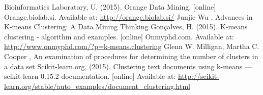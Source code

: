 \documentclass[12pt]{article}
\begin{document}
\begin{thebibliography}{99}
Bioinformatics Laboratory, U. (2015). Orange Data Mining. [online] Orange.biolab.si. Available at: \url{http://orange.biolab.si/} 
 Junjie Wu , Advances in K-means Clustering: A Data Mining Thinking
Gonçalves, H. (2015). K-means clustering - algorithm and examples. [online] Onmyphd.com. Available at: \url{http://www.onmyphd.com/?p=k-means.clustering}
    Glenn W. Milligan, Martha C. Cooper , An examination of procedures for determining the number of clusters in a data set
Scikit-learn.org, (2015). Clustering text documents using k-means — scikit-learn 0.15.2 documentation. [online] Available at: \url{http://scikit-learn.org/stable/auto_examples/document_clustering.html} 
 
\end{thebibliography}
\end{document}
